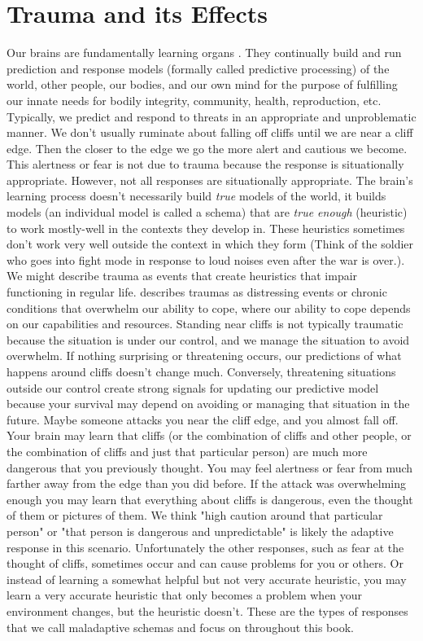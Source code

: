 \documentclass[12pt,letterpaper]{book}
\begin{document}
\section{Trauma and its Effects}
\label{sec:trauma}
Our brains are fundamentally learning organs \cite{clark2015surfing}. They continually build and run prediction and response models (formally called predictive processing) of the world, other people, our bodies, and our own mind for the purpose of fulfilling our innate needs for bodily integrity, community, health, reproduction, etc. Typically, we predict and respond to threats in an appropriate and unproblematic manner. We don't usually ruminate about falling off cliffs until we are near a cliff edge. Then the closer to the edge we go the more alert and cautious we become. This alertness or fear is not due to trauma because the response is situationally appropriate. However, not all responses are situationally appropriate. The brain's learning process doesn't necessarily build \textit{true} models of the world, it builds models (an individual model is called a schema) that are \textit{true enough} (heuristic) to work mostly-well in the contexts they develop in. These heuristics sometimes don't work very well outside the context in which they form (Think of the soldier who goes into fight mode in response to loud noises even after the war is over.). We might describe trauma as events that create heuristics that impair functioning in regular life. \textcite{laneReconsolidation} describes traumas as distressing events or chronic conditions that overwhelm our ability to cope, where our ability to cope depends on our capabilities and resources. Standing near cliffs is not typically traumatic because the situation is under our control, and we manage the situation to avoid overwhelm. If nothing surprising or threatening occurs, our predictions of what happens around cliffs doesn't change much. Conversely, threatening situations outside our control create strong signals for updating our predictive model because your survival may depend on avoiding or managing that situation in the future. Maybe someone attacks you near the cliff edge, and you almost fall off. Your brain may learn that cliffs (or the combination of cliffs and other people, or the combination of cliffs and just that particular person) are much more dangerous that you previously thought. You may feel alertness or fear from much farther away from the edge than you did before. If the attack was overwhelming enough you may learn that everything about cliffs is dangerous, even the thought of them or pictures of them. We think "high caution around that particular person" or "that person is dangerous and unpredictable" is likely the adaptive response in this scenario. Unfortunately the other responses, such as fear at the thought of cliffs, sometimes occur and can cause problems for you or others. Or instead of learning a somewhat helpful but not very accurate heuristic, you may learn a very accurate heuristic that only becomes a problem when your environment changes, but the heuristic doesn't. These are the types of responses that we call maladaptive schemas and focus on throughout this book.
\end{document}
